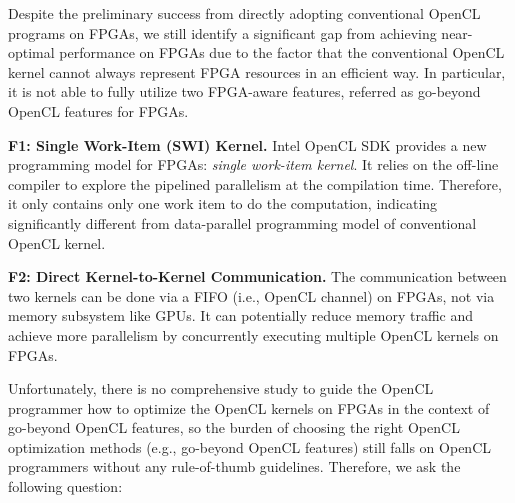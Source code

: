 Despite the preliminary success from directly adopting conventional OpenCL programs on FPGAs, we still identify a significant gap from achieving near-optimal performance on FPGAs due to the factor that the conventional OpenCL kernel cannot always represent FPGA resources in an efficient way. In particular, it is not able to fully utilize two FPGA-aware features, referred as go-beyond OpenCL features for FPGAs. %

\vspace{0.3em}
\noindent
{\bf F1: Single Work-Item (SWI) Kernel. }Intel OpenCL SDK provides a new programming model for FPGAs: \emph{single work-item kernel}. It relies on the off-line compiler to explore the pipelined parallelism at the compilation time. Therefore, it only contains only one work item to do the computation, indicating significantly different from data-parallel programming model of conventional OpenCL kernel. %

\vspace{0.3em}
\noindent
{\bf F2: Direct Kernel-to-Kernel Communication. }The communication between two kernels can be done via a FIFO (i.e., OpenCL channel) on FPGAs, not via memory subsystem like GPUs. It can potentially reduce memory traffic and achieve more parallelism by concurrently executing multiple OpenCL kernels on FPGAs. 
\vspace{0.3em}

Unfortunately, there is no comprehensive study to guide the OpenCL programmer how to optimize the OpenCL kernels on FPGAs in the context of go-beyond OpenCL features, so the burden of choosing the right OpenCL optimization methods (e.g., go-beyond OpenCL features) still falls on OpenCL programmers without any rule-of-thumb guidelines. %
Therefore, we ask the following question: 

